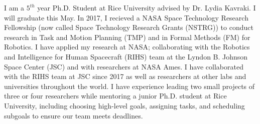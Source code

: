 
\small{I am a $5^{th}$ year Ph.D. Student at Rice University advised by Dr. Lydia Kavraki. I will graduate this May. In 2017, I recieved a NASA Space Technology Research Fellowship (now called Space Technology Research Grants (NSTRG)) to conduct research in Task and Motion Planning (TMP) and in Formal Methods (FM) for Robotics. I have applied my research at NASA; collaborating with the Robotics and Intelligence for Human Spacecraft (RIHS) team at the Lyndon B. Johnson Space Center (JSC) and with researchers at NASA Ames. I have collaborated with the RIHS team at JSC since 2017 as well as researchers at other labs and universities throughout the world. I have experience leading two small projects of three or four researchers while mentoring a junior Ph.D. student at Rice University, including choosing high-level goals, assigning tasks, and scheduling subgoals to ensure our team meets deadlines.}
